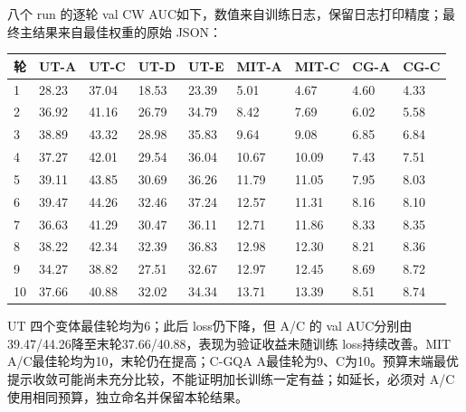 \documentclass[12pt,a4paper,UTF8]{ctexart}
\newenvironment{reporttable}{\par\smallskip\begingroup\small\centering}{\par\endgroup\smallskip}
\begin{document}
八个 run 的逐轮 val CW AUC如下，数值来自训练日志，保留日志打印精度；最终主结果来自最佳权重的原始 JSON：

\begin{reporttable}

\scriptsize

\begin{tabularx}{\linewidth}{|Z|Z|Z|Z|Z|Z|Z|Z|Z|}
\hline

\textbf{轮} & \textbf{UT-A} & \textbf{UT-C} & \textbf{UT-D} & \textbf{UT-E} & \textbf{MIT-A} & \textbf{MIT-C} & \textbf{CG-A} & \textbf{CG-C} \\ \hline

1 & 28.23 & 37.04 & 18.53 & 23.39 & 5.01 & 4.67 & 4.60 & 4.33 \\ \hline

2 & 36.92 & 41.16 & 26.79 & 34.79 & 8.42 & 7.69 & 6.02 & 5.58 \\ \hline

3 & 38.89 & 43.32 & 28.98 & 35.83 & 9.64 & 9.08 & 6.85 & 6.84 \\ \hline

4 & 37.27 & 42.01 & 29.54 & 36.04 & 10.67 & 10.09 & 7.43 & 7.51 \\ \hline

5 & 39.11 & 43.85 & 30.69 & 36.26 & 11.79 & 11.05 & 7.95 & 8.03 \\ \hline

6 & 39.47 & 44.26 & 32.46 & 37.24 & 12.57 & 11.31 & 8.16 & 8.10 \\ \hline

7 & 36.63 & 41.29 & 30.47 & 36.11 & 12.71 & 11.86 & 8.33 & 8.35 \\ \hline

8 & 38.22 & 42.34 & 32.39 & 36.83 & 12.98 & 12.30 & 8.21 & 8.36 \\ \hline

9 & 34.27 & 38.82 & 27.51 & 32.67 & 12.97 & 12.45 & 8.69 & 8.72 \\ \hline

10 & 37.66 & 40.88 & 32.02 & 34.34 & 13.71 & 13.39 & 8.51 & 8.74 \\ \hline

\end{tabularx}\end{reporttable}

UT 四个变体最佳轮均为6；此后 loss仍下降，但 A/C 的 val AUC分别由39.47/44.26降至末轮37.66/40.88，表现为验证收益未随训练 loss持续改善。MIT A/C最佳轮均为10，末轮仍在提高；C-GQA A最佳轮为9、C为10。预算末端最优提示收敛可能尚未充分比较，不能证明加长训练一定有益；如延长，必须对 A/C 使用相同预算，独立命名并保留本轮结果。
\end{document}
